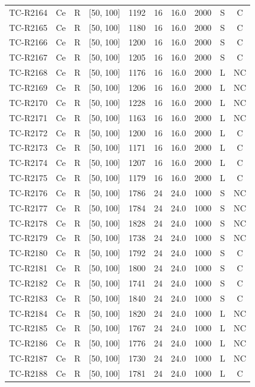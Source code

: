 \begin{longtable}{lccccccccc}
TC-R2164 & Ce & R & [50, 100] & 1192 & 16 & 16.0 & 2000 & S & C \\
TC-R2165 & Ce & R & [50, 100] & 1180 & 16 & 16.0 & 2000 & S & C \\
TC-R2166 & Ce & R & [50, 100] & 1200 & 16 & 16.0 & 2000 & S & C \\
TC-R2167 & Ce & R & [50, 100] & 1205 & 16 & 16.0 & 2000 & S & C \\
TC-R2168 & Ce & R & [50, 100] & 1176 & 16 & 16.0 & 2000 & L & NC \\
TC-R2169 & Ce & R & [50, 100] & 1206 & 16 & 16.0 & 2000 & L & NC \\
TC-R2170 & Ce & R & [50, 100] & 1228 & 16 & 16.0 & 2000 & L & NC \\
TC-R2171 & Ce & R & [50, 100] & 1163 & 16 & 16.0 & 2000 & L & NC \\
TC-R2172 & Ce & R & [50, 100] & 1200 & 16 & 16.0 & 2000 & L & C \\
TC-R2173 & Ce & R & [50, 100] & 1171 & 16 & 16.0 & 2000 & L & C \\
TC-R2174 & Ce & R & [50, 100] & 1207 & 16 & 16.0 & 2000 & L & C \\
TC-R2175 & Ce & R & [50, 100] & 1179 & 16 & 16.0 & 2000 & L & C \\
TC-R2176 & Ce & R & [50, 100] & 1786 & 24 & 24.0 & 1000 & S & NC \\
TC-R2177 & Ce & R & [50, 100] & 1784 & 24 & 24.0 & 1000 & S & NC \\
TC-R2178 & Ce & R & [50, 100] & 1828 & 24 & 24.0 & 1000 & S & NC \\
TC-R2179 & Ce & R & [50, 100] & 1738 & 24 & 24.0 & 1000 & S & NC \\
TC-R2180 & Ce & R & [50, 100] & 1792 & 24 & 24.0 & 1000 & S & C \\
TC-R2181 & Ce & R & [50, 100] & 1800 & 24 & 24.0 & 1000 & S & C \\
TC-R2182 & Ce & R & [50, 100] & 1741 & 24 & 24.0 & 1000 & S & C \\
TC-R2183 & Ce & R & [50, 100] & 1840 & 24 & 24.0 & 1000 & S & C \\
TC-R2184 & Ce & R & [50, 100] & 1820 & 24 & 24.0 & 1000 & L & NC \\
TC-R2185 & Ce & R & [50, 100] & 1767 & 24 & 24.0 & 1000 & L & NC \\
TC-R2186 & Ce & R & [50, 100] & 1776 & 24 & 24.0 & 1000 & L & NC \\
TC-R2187 & Ce & R & [50, 100] & 1730 & 24 & 24.0 & 1000 & L & NC \\
TC-R2188 & Ce & R & [50, 100] & 1781 & 24 & 24.0 & 1000 & L & C \\

\end{longtable}

